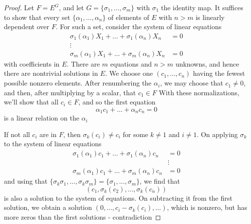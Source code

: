 \documentclass[11pt]{article}
\begin{document}
\begin{proof}
Let \(F=E^G\), and let \(G=\{\sigma_1,\dots,\sigma_m\}\) with \(\sigma_1\) the identity map. It suffices to show that
every set \(\{\alpha_1,\dots,\alpha_n\}\) of elements of \(E\) with \(n>m\) is linearly dependent over \(F\). For
such a set, consider the system of linear equations
\begin{align*}
\sigma_1(\alpha_1)X_1+\dots+\sigma_1(\alpha_n)X_n&=0\\
\vdots\hspace{2cm}&\\
\sigma_m(\alpha_1)X_1+\dots+\sigma_m(\alpha_n)X_n&=0
\end{align*}
with coefficients in \(E\). There are \(m\) equations and \(n>m\) unknowns, and hence there are
nontrivial solutions in \(E\). We choose one \((c_1,\dots,c_n)\) having the fewest possible nonzero
elements. After renumbering the \(\alpha_i\), we may choose that \(c_1\neq 0\), and then, after
multiplying by a scalar, that \(c_1\in F\)
With these normalizations, we'll show that
all \(c_i\in F\), and so the first equation
\begin{equation*}
\alpha_1c_1+\dots+\alpha_nc_n=0
\end{equation*}
is a linear relation on the \(\alpha_i\)

If not all \(c_i\) are in \(F\), then \(\sigma_k(c_i)\neq c_i\) for some \(k\neq 1\) and \(i\neq 1\). On
applying \(\sigma_k\) to the system of linear equations
\begin{align*}
\sigma_1(\alpha_1)c_1+\dots+\sigma_1(\alpha_n)c_n&=0\\
&\vdots\\
\sigma_m(\alpha_1)c_1+\dots+\sigma_m(\alpha_n)c_n&=0
\end{align*}
and using that \(\{\sigma_k\sigma_1,\dots,\sigma_k\sigma_m\}=\{\sigma_1,\dots,\sigma_m\}\), we find that
\begin{equation*}
(c_1,\sigma_k(c_2),\dots,\sigma_k(c_n))
\end{equation*}
is also a solution to the system of equations. On subtracting it from the first solution, we
obtain a solution \((0,\dots,c_i-\sigma_k(c_i),\dots)\), which is nonzero, but has more zeros than the first
solutions - contradiction
\end{proof}
\end{document}
